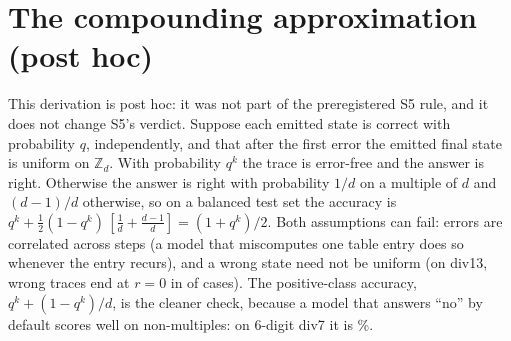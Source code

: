 \documentclass{article}
\theoremstyle{definition}
\begin{document}
\section{The compounding approximation (post hoc)}
\label{app:compound}
This derivation is post hoc: it was not part of the preregistered S5 rule, and it does not change S5's verdict. Suppose each emitted state is correct with probability $q$, independently, and that after the first error the emitted final state is uniform on $\mathbb{Z}_d$. With probability $q^k$ the trace is error-free and the answer is right. Otherwise the answer is right with probability $1/d$ on a multiple of $d$ and $(d-1)/d$ otherwise, so on a balanced test set the accuracy is $q^k+\tfrac12(1-q^k)\,[\tfrac1d+\tfrac{d-1}d]=(1+q^k)/2$. Both assumptions can fail: errors are correlated across steps (a model that miscomputes one table entry does so whenever the entry recurs), and a wrong state need not be uniform (on div13, wrong traces end at $r=0$ in \divthirteenWrongZero{} of \divthirteenWrongN{} cases). The positive-class accuracy, $q^k+(1-q^k)/d$, is the cleaner check, because a model that answers ``no'' by default scores well on non-multiples: on 6-digit div7 it is \divsevenSixByes\%.
\end{document}

